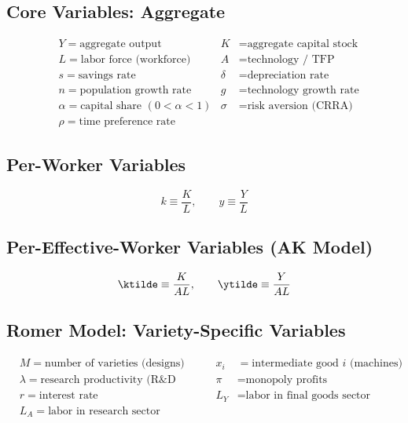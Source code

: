 
\subsection*{Core Variables: Aggregate}
\begin{align*}
& Y = \text{aggregate output} & K &= \text{aggregate capital stock} \\
& L = \text{labor force (workforce)} & A &= \text{technology / TFP} \\
& s = \text{savings rate} & \delta &= \text{depreciation rate} \\
& n = \text{population growth rate} & g &= \text{technology growth rate} \\
& \alpha = \text{capital share } (0 < \alpha < 1) & \sigma &= \text{risk aversion (CRRA)} \\
& \rho = \text{time preference rate}
\end{align*}

\medskip
\subsection*{Per-Worker Variables}
\[
k \equiv \frac{K}{L}, \qquad y \equiv \frac{Y}{L}
\]

\medskip
\subsection*{Per-Effective-Worker Variables (AK Model)}
\[
\ktilde \equiv \frac{K}{AL}, \qquad \ytilde \equiv \frac{Y}{AL}
\]

\medskip
\subsection*{Romer Model: Variety-Specific Variables}
\begin{align*}
& M = \text{number of varieties (designs)} & x_i &= \text{intermediate good } i \text{ (machines)} \\
& \lambda = \text{research productivity (R\&D efficiency)} & \pi &= \text{monopoly profits} \\
& r = \text{interest rate} & L_Y &= \text{labor in final goods sector} \\
& L_A = \text{labor in research sector}
\end{align*}

